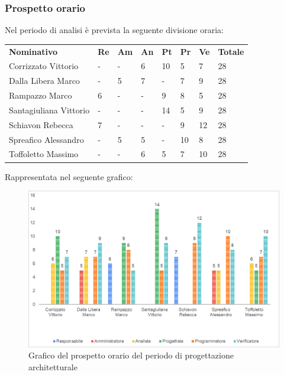 	\subsubsection{Prospetto orario}
	Nel periodo di analisi è prevista la seguente divisione oraria:
	\begin{longtable} {				
		>{}p{40mm}  
		>{}p{8mm}
		>{}p{8mm}
		>{}p{8mm}
		>{}p{8mm}
		>{}p{8mm}
		>{}p{8mm}
		>{}p{12mm}				
	}			
	\rowcolor{gray!50}
	\textbf{Nominativo} & \textbf{Re} & \textbf{Am} & \textbf{An} & \textbf{Pt} & \textbf{Pr} & \textbf{Ve} & \textbf{Totale}	\TBstrut \\ [2mm]
	Corrizzato Vittorio & - & - & 6 & 10 & 5 & 7 & 28 \TBstrut \\ [2mm]
	Dalla Libera Marco & - & 5 & 7 & - & 7 & 9 & 28 \TBstrut \\ [2mm]
	Rampazzo Marco & 6 & - & - & 9 & 8 & 5 & 28 \TBstrut \\ [2mm]
	Santagiuliana Vittorio & - & - & - & 14 & 5 & 9 & 28 \TBstrut \\ [2mm]
	Schiavon Rebecca & 7 & - & - & - & 9 & 12 & 28 \TBstrut \\ [2mm]
	Spreafico Alessandro & - & 5 & 5 & - & 10 & 8 & 28 \TBstrut \\ [2mm]
	Toffoletto Massimo & - & - & 6 & 5 & 7 & 10 & 28 \TBstrut \\ [2mm]
	\end{longtable}
	Rappresentata nel seguente grafico: \\
	\begin{figure} [H]
		\includegraphics[width=\linewidth]{./img/Grafici/3.png}
		\caption{Grafico del prospetto orario del periodo di progettazione architetturale}
	\end{figure}

